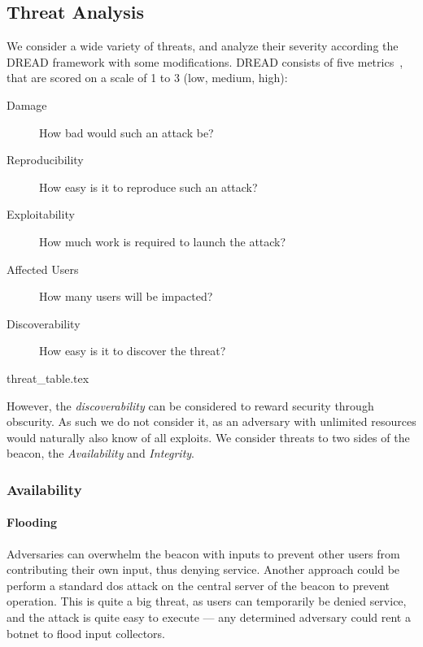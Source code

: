 \subsection{Threat Analysis}
We consider a wide variety of threats, and analyze their severity according the DREAD framework with some modifications. DREAD consists of five metrics~\cite{dread}, that are scored on a scale of 1 to 3 (low, medium, high):
\begin{description}
    \item [Damage] How bad would such an attack be?
    \item [Reproducibility] How easy is it to reproduce such an attack?
    \item [Exploitability] How much work is required to launch the attack?
    \item [Affected Users] How many users will be impacted?
    \item [Discoverability] How easy is it to discover the threat?
\end{description}

{threat_table.tex}

However, the \emph{discoverability} can be considered to reward security through obscurity. As such we do not consider it, as an adversary with unlimited resources would naturally also know of all exploits.
We consider threats to two sides of the beacon, the \emph{Availability} and \emph{Integrity}.

\subsubsection{Availability}

\paragraph{Flooding} Adversaries can overwhelm the beacon with inputs to prevent other users from contributing their own input, thus denying service. Another approach could be perform a standard \gls{dos} attack on the central server of the beacon to prevent operation. This is quite a big threat, as users can temporarily be denied service, and the attack is quite easy to execute --- any determined adversary could rent a botnet to flood input collectors.    %
